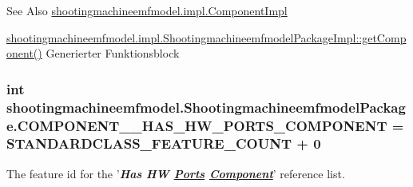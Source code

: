 \begin{DoxySeeAlso}{See Also}
\hyperlink{classshootingmachineemfmodel_1_1impl_1_1_component_impl}{shootingmachineemfmodel.\-impl.\-Component\-Impl} 

\hyperlink{classshootingmachineemfmodel_1_1impl_1_1_shootingmachineemfmodel_package_impl_a375240560ab7b64152ec7b4e53a51ee3}{shootingmachineemfmodel.\-impl.\-Shootingmachineemfmodel\-Package\-Impl\-::get\-Component()} Generierter Funktionsblock 
\end{DoxySeeAlso}
\hypertarget{interfaceshootingmachineemfmodel_1_1_shootingmachineemfmodel_package_ac644767caab4c5f8046af2bdaaeedf09}{
\subsubsection[{C\-O\-M\-P\-O\-N\-E\-N\-T\-\_\-\-\_\-\-H\-A\-S\-\_\-\-H\-W\-\_\-\-P\-O\-R\-T\-S\-\_\-\-C\-O\-M\-P\-O\-N\-E\-N\-T}]{\setlength{\rightskip}{0pt plus 5cm}int shootingmachineemfmodel.\-Shootingmachineemfmodel\-Package.\-C\-O\-M\-P\-O\-N\-E\-N\-T\-\_\-\-\_\-\-H\-A\-S\-\_\-\-H\-W\-\_\-\-P\-O\-R\-T\-S\-\_\-\-C\-O\-M\-P\-O\-N\-E\-N\-T = {\bf S\-T\-A\-N\-D\-A\-R\-D\-C\-L\-A\-S\-S\-\_\-\-F\-E\-A\-T\-U\-R\-E\-\_\-\-C\-O\-U\-N\-T} + 0}}\label{interfaceshootingmachineemfmodel_1_1_shootingmachineemfmodel_package_ac644767caab4c5f8046af2bdaaeedf09}
The feature id for the '{\itshape {\bfseries Has H\-W \hyperlink{interfaceshootingmachineemfmodel_1_1_ports}{Ports} \hyperlink{interfaceshootingmachineemfmodel_1_1_component}{Component}}}' reference list.

